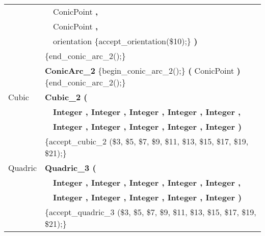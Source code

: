 \begin{ccTexOnly}
\begin{tabular}{*{2}{| l} |}
              & \ \ ConicPoint {\bf \Large ,}                    \\
              & \ \ ConicPoint {\bf \Large ,}                    \\
              & \ \ orientation \{accept\_orientation(\$10);\} {\bf \Large )}                  \\
              & \{end\_conic\_arc\_2();\}\\
              & {\bf ConicArc\_2} \{begin\_conic\_arc\_2();\} {\bf \Large (} ConicPoint {\bf \Large )} \{end\_conic\_arc\_2();\}\\ \hline
Cubic   & {\bf Cubic\_2 (}        \\
        & \ \ {\bf Integer , Integer , Integer , Integer , Integer ,} \\
        & \ \ {\bf Integer , Integer , Integer , Integer , Integer )}  \\
        & \{accept\_cubic\_2 (\$3, \$5, \$7, \$9, \$11, \$13, \$15, \$17, \$19, \$21);\}\\ \hline
Quadric & {\bf Quadric\_3 (}      \\
        & \ \ {\bf Integer , Integer , Integer , Integer , Integer ,}  \\
        & \ \ {\bf Integer , Integer , Integer , Integer , Integer )}                  \\ 
        & \{accept\_quadric\_3 (\$3, \$5, \$7, \$9, \$11, \$13, \$15, \$17, \$19, \$21);\}\\ \hline
\end{tabular}
\end{ccTexOnly}

